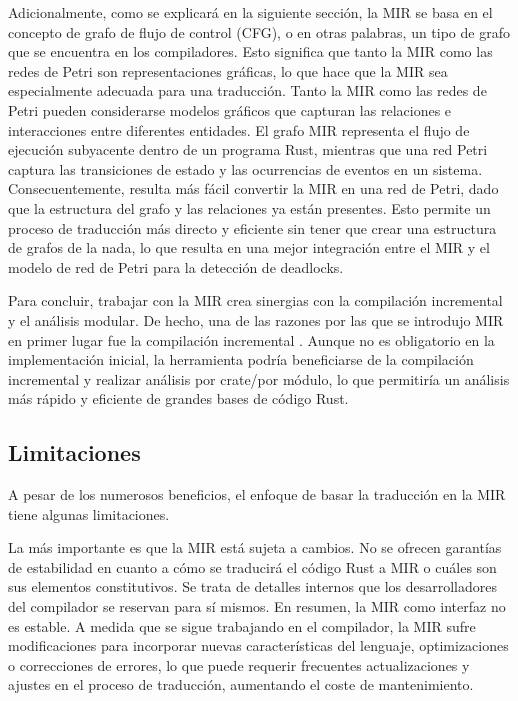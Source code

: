 Adicionalmente, como se explicará en la siguiente sección, la \acrshort{MIR} se basa en el concepto de grafo de
flujo de control (\acrfull{CFG}), o en otras palabras, un tipo de grafo que se encuentra en los compiladores.
Esto significa que tanto la \acrshort{MIR} como las redes de Petri son representaciones gráficas, lo que hace
que la \acrshort{MIR} sea especialmente adecuada para una traducción. Tanto la \acrshort{MIR}  como las redes de Petri
pueden considerarse modelos gráficos que capturan las relaciones e interacciones entre
diferentes entidades. El grafo \acrshort{MIR} representa el flujo de ejecución subyacente dentro de un
programa Rust, mientras que una red Petri captura las transiciones de estado y las ocurrencias
de eventos en un sistema. Consecuentemente, resulta más fácil convertir la \acrshort{MIR} en una red de Petri,
dado que la estructura del grafo y las relaciones ya están presentes. Esto permite un proceso de
traducción más directo y eficiente sin tener que crear una estructura de grafos de la nada, lo que
resulta en una mejor integración entre el \acrshort{MIR} y el modelo de red de Petri para la detección de
deadlocks.

Para concluir, trabajar con la \acrshort{MIR} crea sinergias con la compilación incremental y el análisis
modular. De hecho, una de las razones por las que se introdujo MIR en primer lugar fue la
compilación incremental \cite{matsakis2016mir}. Aunque no es obligatorio en la implementación
inicial, la herramienta podría beneficiarse de la compilación incremental y realizar análisis por
crate/por módulo, lo que permitiría un análisis más rápido y eficiente de grandes bases de
código Rust.

\subsection{Limitaciones}

A pesar de los numerosos beneficios, el enfoque de basar la traducción
en la \acrfull{MIR} tiene algunas limitaciones.

La más importante es que la \acrshort{MIR} está sujeta a cambios. No se ofrecen garantías de estabilidad
en cuanto a cómo se traducirá el código Rust a \acrshort{MIR} o cuáles son sus elementos constitutivos.
Se trata de detalles internos que los desarrolladores del compilador se reservan para sí
mismos. En resumen, la \acrshort{MIR} como interfaz no es estable. A medida que se sigue trabajando en
el compilador, la \acrshort{MIR} sufre modificaciones para incorporar nuevas características del lenguaje,
optimizaciones o correcciones de errores, lo que puede requerir frecuentes actualizaciones y
ajustes en el proceso de traducción, aumentando el coste de mantenimiento.


